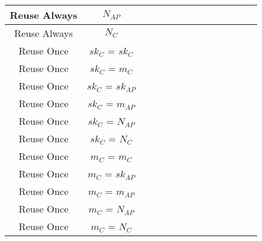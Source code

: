\documentclass[crop]{standalone}
\newcommand{\noattack}{\color{ForestGreen}\usym{2713}\color{black}}
\newcommand{\attack}{\color{red}\usym{2717}\color{black}}
\begin{document}
{\begin{tabular}{|c|c|c|c|c|c|c|c|c|c|c|c|c|c|}
Reuse Always & $N_{AP}$ & \noattack & \noattack & \noattack & \noattack & \noattack & \noattack & \noattack & \noattack & \noattack & \noattack & \noattack & \noattack\\ \hline
Reuse Always & $N_C$ & \noattack & \noattack & \noattack & \noattack & \noattack & \noattack & \noattack & \noattack & \noattack & \noattack & \noattack & \noattack\\ \hline
Reuse Once & $sk_C$ = $sk_C$ & \noattack & \noattack & \noattack & \noattack & \noattack & \noattack & \noattack & \noattack & \noattack & \noattack & \noattack & \noattack\\ \hline
Reuse Once & $sk_C$ = $m_C$ & \noattack & \noattack & \noattack & \noattack & \noattack & \noattack & \noattack & \noattack & \noattack & \noattack & \noattack & \noattack\\ \hline
Reuse Once & $sk_C$ = $sk_{AP}$ & \noattack & \noattack & \noattack & \noattack & \noattack & \noattack & \noattack & \noattack & \noattack & \noattack & \noattack & \noattack\\ \hline
Reuse Once & $sk_C$ = $m_{AP}$ & \noattack & \noattack & \noattack & \noattack & \noattack & \noattack & \noattack & \noattack & \noattack & \noattack & \noattack & \noattack\\ \hline
Reuse Once & $sk_C$ = $N_{AP}$ & \attack & \attack & \attack & \attack & \attack & \attack & \attack & \attack & \attack & \attack & \noattack & \noattack\\ \hline
Reuse Once & $sk_C$ = $N_C$ & \attack & \attack & \attack & \attack & \attack & \attack & \attack & \attack & \attack & \attack & \noattack & \noattack\\ \hline
Reuse Once & $m_C$ = $m_C$ & \noattack & \noattack & \noattack & \noattack & \noattack & \noattack & \noattack & \noattack & \noattack & \noattack & \noattack & \noattack\\ \hline
Reuse Once & $m_C$ = $sk_{AP}$ & \noattack & \noattack & \noattack & \noattack & \noattack & \noattack & \noattack & \noattack & \noattack & \noattack & \noattack & \noattack\\ \hline
Reuse Once & $m_C$ = $m_{AP}$ & \noattack & \noattack & \noattack & \noattack & \noattack & \noattack & \noattack & \noattack & \noattack & \noattack & \noattack & \noattack\\ \hline
Reuse Once & $m_C$ = $N_{AP}$ & \attack & \attack & \attack & \attack & \attack & \attack & \attack & \attack & \attack & \attack & \noattack & \noattack\\ \hline
Reuse Once & $m_C$ = $N_C$ & \attack & \attack & \attack & \attack & \attack & \attack & \attack & \attack & \attack & \attack & \noattack & \noattack\\ \hline

\end{tabular}}
\end{document}
